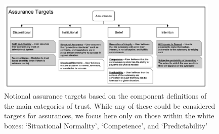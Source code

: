 \begin{figure}[t]%
    \includegraphics[width=0.95\textwidth]{Figures/Assurances.pdf}%
    \caption{Notional assurance targets based on the component definitions of the main categories of trust. While any of these could be considered targets for assurances, we focus here only on those within the white boxes: `Situational Normality', `Competence', and `Predictability'}
    \label{fig:Assurance_classes}
\end{figure}
